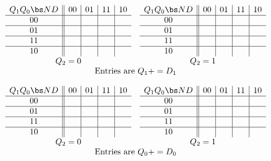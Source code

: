 \begin{description}
{$$\begin{array}{cc}
\begin{array} {c||c|c|c|c}
	Q_1 Q_0 \bs ND	& 00 & 01 & 11 & 10 \\ \hline
        00        	&    &   &   &    \\ \hline
        01        	&    &   &   &    \\ \hline
        11        	&    &   &   &   \\ \hline
        10        	&    &   &   &    \\
\end{array}
&
\begin{array} {c||c|c|c|c}
	Q_1 Q_0 \bs ND	& 00 & 01 & 11 & 10 \\ \hline
        00        	&   &   &   &   \\ \hline
        01        	&   &   &   &   \\ \hline
        11        	&   &   &   &   \\ \hline
        10        	&   &   &   &   \\
\end{array} \\
Q_2=0 & Q_2=1 \\
\multicolumn{2}{c}{{\rm Entries\ are\ } Q_1+=D_1}
\end{array} $$


$$\begin{array}{cc}
\begin{array} {c||c|c|c|c}
	Q_1 Q_0 \bs ND	& 00 & 01 & 11 & 10 \\ \hline
        00        	&    &   &   &    \\ \hline
        01        	&    &   &   &    \\ \hline
        11        	&    &   &   &   \\ \hline
        10        	&    &   &   &    \\
\end{array}
&
\begin{array} {c||c|c|c|c}
	Q_1 Q_0 \bs ND	& 00 & 01 & 11 & 10 \\ \hline
        00        	&   &   &   &   \\ \hline
        01        	&   &   &   &   \\ \hline
        11        	&   &   &   &   \\ \hline
        10        	&   &   &   &   \\
\end{array} \\
Q_2=0 & Q_2=1 \\
\multicolumn{2}{c}{{\rm Entries\ are\ } Q_0+=D_0}
\end{array} $$
}
\pagebreak






\end{description}
